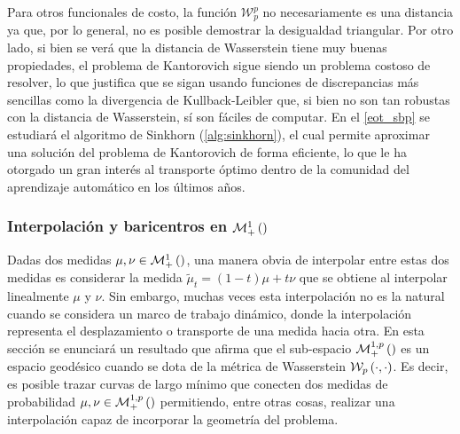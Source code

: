 

Para otros funcionales de costo, la función $\mathcal{W}_p^p$ no necesariamente es una distancia ya que, por lo general, no es posible demostrar la desigualdad triangular. Por otro lado, si bien se verá que la distancia de Wasserstein tiene muy buenas propiedades, el problema de Kantorovich sigue siendo un problema costoso de resolver, lo que justifica que se sigan usando funciones de discrepancias más sencillas como la divergencia de Kullback-Leibler que, si bien no son tan robustas con la distancia de Wasserstein, sí son fáciles de computar. En el \autoref{eot_sbp} se estudiará el algoritmo de Sinkhorn (\autoref{alg:sinkhorn}), el cual permite aproximar una solución del problema de Kantorovich de forma eficiente, lo que le ha otorgado un gran interés al transporte óptimo dentro de la comunidad del aprendizaje automático en los últimos años.

\subsubsection{Interpolación y baricentros en $\mathcal{M}_+^1\left(\right)$}

Dadas dos medidas $\mu,\nu\in\mathcal{M}_+^1\left(\right)$, una manera obvia de interpolar entre estas dos medidas es considerar la medida $\tilde{\mu}_t = (1-t)\mu+t\nu$ que se obtiene al interpolar linealmente $\mu$ y $\nu$. Sin embargo, muchas veces esta interpolación no es la natural cuando se considera un marco de trabajo dinámico, donde la interpolación representa el desplazamiento o transporte de una medida hacia otra. En esta sección se enunciará un resultado que afirma que el sub-espacio $\mathcal{M}_+^{1,p}\left(\right)$ es un espacio geodésico cuando se dota de la métrica de Wasserstein $\mathcal{W}_{p}\left(\cdot,\cdot\right)$. Es decir, es posible trazar curvas de largo mínimo que conecten dos medidas de probabilidad $\mu,\nu\in\mathcal{M}_+^{1,p}\left(\right)$ permitiendo, entre otras cosas, realizar una interpolación capaz de incorporar la geometría del problema.

